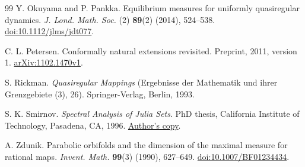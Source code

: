 \documentclass[11pt,reqno]{amsart}
\theoremstyle{plain}
\theoremstyle{definition}
\theoremstyle{remark}
\numberwithin{equation}{section}
\begin{document}
\begin{thebibliography}{99}
Y. Okuyama and P. Pankka. Equilibrium measures for uniformly quasiregular dynamics.
\emph{J. Lond. Math. Soc.} (2) \textbf{89}(2) (2014), 524--538.
\href{https://doi.org/10.1112/jlms/jdt077}{doi:10.1112/jlms/jdt077}.

C. L. Petersen. Conformally natural extensions revisited.
Preprint, 2011, version 1. \href{https://arxiv.org/abs/1102.1470v1}{arXiv:1102.1470v1}.

S. Rickman. \emph{Quasiregular Mappings} (Ergebnisse der Mathematik und ihrer Grenzgebiete (3), 26).
Springer-Verlag, Berlin, 1993.

S. K. Smirnov. \emph{Spectral Analysis of Julia Sets}.
PhD thesis, California Institute of Technology, Pasadena, CA, 1996.
\href{https://www.unige.ch/~smirnov/papers/phd.pdf}{Author's copy}.

A. Zdunik. Parabolic orbifolds and the dimension of the maximal measure for rational maps.
\emph{Invent. Math.} \textbf{99}(3) (1990), 627--649.
\href{https://doi.org/10.1007/BF01234434}{doi:10.1007/BF01234434}.

\end{thebibliography}
\end{document}
